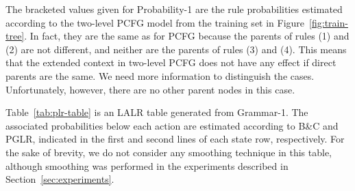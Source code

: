 The bracketed values given for Probability-1 are the rule probabilities
estimated according to the two-level PCFG model from the training set in
Figure~\ref{fig:train-tree}. In fact, they are the same as for PCFG
because the parents of rules (1) and (2) are not different, and neither
are the parents of rules (3) and (4). This means that the extended
context in two-level PCFG does not have any effect if direct parents are
the same. We need more information to distinguish the
cases. Unfortunately, however, there are no other parent nodes in this
case.

Table~\ref{tab:plr-table} is an LALR table generated from Grammar-1. The
associated probabilities below each action are estimated according to
B\&C and PGLR, indicated in the first and second lines of each state
row, respectively. For the sake of brevity, we do not consider any
smoothing technique in this table, although smoothing was performed in
the experiments described in Section~\ref{sec:experiments}.

